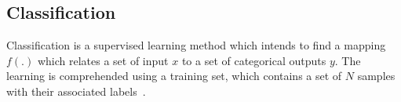 




\subsection{Classification}\label{subsec:cls}
Classification is a supervised learning method which intends to find a mapping $f(.)$ which relates a set of input $x$ to a set of categorical outputs $y$.
The learning is comprehended using a training set, which contains a set of $N$ samples with their associated labels~\cite{murphy2012machine}.

